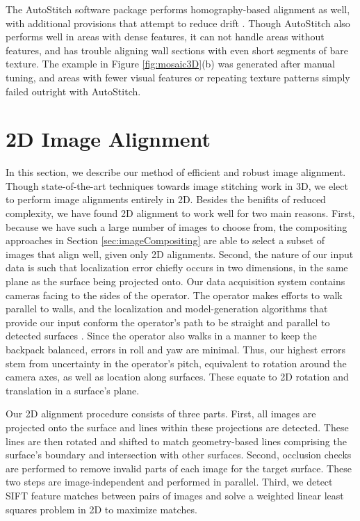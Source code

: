 \documentclass[]{spie}  %
\begin{document}
The AutoStitch software package performs homography-based alignment as
well, with additional provisions that attempt to reduce drift
\cite{panorama2d, autostitch}. Though AutoStitch also performs well in
areas with dense features, it can not handle areas without features,
and has trouble aligning wall sections with even short segments of
bare texture. The example in Figure \ref{fig:mosaic3D}(b) was
generated after manual tuning, and areas with fewer visual features or
repeating texture patterns simply failed outright with AutoStitch.



\section{2D Image Alignment}
\label{sec:2dAlignment}

In this section, we describe our method of efficient and robust image
alignment. Though state-of-the-art techniques towards image stitching
work in 3D, we elect to perform image alignments entirely in
2D. Besides the benifits of reduced complexity, we have found 2D
alignment to work well for two main reasons. First, because we have
such a large number of images to choose from, the compositing
approaches in Section \ref{sec:imageCompositing} are able to select a
subset of images that align well, given only 2D alignments. Second,
the nature of our input data is such that localization error chiefly
occurs in two dimensions, in the same plane as the surface being
projected onto. Our data acquisition system contains cameras facing to
the sides of the operator. The operator makes efforts to walk parallel
to walls, and the localization and model-generation algorithms that
provide our input conform the operator's path to be straight and
parallel to detected surfaces \cite{kua2012loopclosure,
  sanchez2012point}. Since the operator also walks in a manner to keep
the backpack balanced, errors in roll and yaw are minimal. Thus, our
highest errors stem from uncertainty in the operator's pitch,
equivalent to rotation around the camera axes, as well as location
along surfaces. These equate to 2D rotation and translation in a
surface's plane.

Our 2D alignment procedure consists of three parts. First, all images
are projected onto the surface and lines within these projections are
detected. These lines are then rotated and shifted to match
geometry-based lines comprising the surface's boundary and
intersection with other surfaces. Second, occlusion checks are
performed to remove invalid parts of each image for the target
surface. These two steps are image-independent and performed in
parallel. Third, we detect SIFT feature matches between pairs of
images and solve a weighted linear least squares problem in 2D to
maximize matches.
\end{document}
